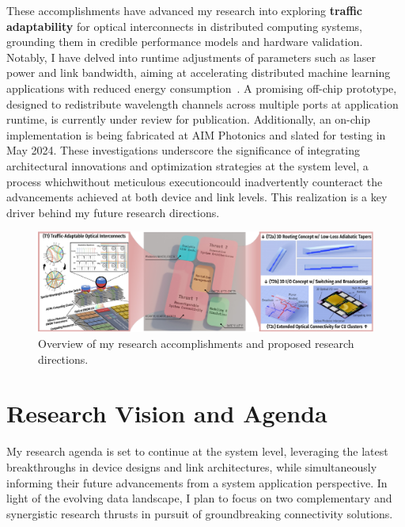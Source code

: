 These accomplishments have advanced my research into exploring \textbf{traffic adaptability} for optical interconnects in distributed computing systems, grounding them in credible performance models and hardware validation. Notably, I have delved into runtime adjustments of parameters such as laser power and link bandwidth, aiming at accelerating distributed machine learning applications with reduced energy consumption~\cite{wangTaskMappingAssistedLaser2019,wangTrafficAdaptivePowerReconfiguration2021,brianJOCN}. A promising off-chip prototype, designed to redistribute wavelength channels across multiple ports at application runtime, is currently under review for publication. Additionally, an on-chip implementation is being fabricated at AIM Photonics and slated for testing in May 2024. These investigations underscore the significance of integrating architectural innovations and optimization strategies at the system level, a process which\textemdash without meticulous execution\textemdash could inadvertently counteract the advancements achieved at both device and link levels. This realization is a key driver behind my future research directions.

\begin{figure}[!t]
    \centering
    \includegraphics[width=\linewidth]{../../fig/research.pdf}
    \caption{Overview of my research accomplishments and proposed research directions.}
    \label{fig:research}
\end{figure}

\section{Research Vision and Agenda}
My research agenda is set to continue at the system level, leveraging the latest breakthroughs in device designs and link architectures, while simultaneously informing their future advancements from a system application perspective. In light of the evolving data landscape, I plan to focus on two complementary and synergistic research thrusts in pursuit of groundbreaking connectivity solutions.

